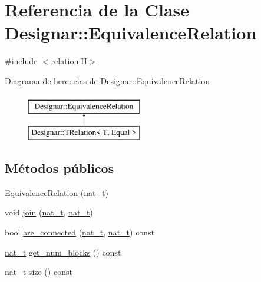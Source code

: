 \hypertarget{class_designar_1_1_equivalence_relation}{}\section{Referencia de la Clase Designar\+:\+:Equivalence\+Relation}
\label{class_designar_1_1_equivalence_relation}


{\ttfamily \#include $<$relation.\+H$>$}

Diagrama de herencias de Designar\+:\+:Equivalence\+Relation\begin{figure}[H]
\begin{center}
\leavevmode
\includegraphics[height=2.000000cm]{class_designar_1_1_equivalence_relation}
\end{center}
\end{figure}
\subsection*{Métodos públicos}
\begin{DoxyCompactItemize}
\item 
\hyperlink{class_designar_1_1_equivalence_relation_a44544ffad6df87c47b30a6cd2a7254f2}{Equivalence\+Relation} (\hyperlink{namespace_designar_aa72662848b9f4815e7bf31a7cf3e33d1}{nat\+\_\+t})
\item 
void \hyperlink{class_designar_1_1_equivalence_relation_a06f07c2d9d53919339afcdd369daa277}{join} (\hyperlink{namespace_designar_aa72662848b9f4815e7bf31a7cf3e33d1}{nat\+\_\+t}, \hyperlink{namespace_designar_aa72662848b9f4815e7bf31a7cf3e33d1}{nat\+\_\+t})
\item 
bool \hyperlink{class_designar_1_1_equivalence_relation_a98972f1d96957b9fac030ca3001094e6}{are\+\_\+connected} (\hyperlink{namespace_designar_aa72662848b9f4815e7bf31a7cf3e33d1}{nat\+\_\+t}, \hyperlink{namespace_designar_aa72662848b9f4815e7bf31a7cf3e33d1}{nat\+\_\+t}) const
\item 
\hyperlink{namespace_designar_aa72662848b9f4815e7bf31a7cf3e33d1}{nat\+\_\+t} \hyperlink{class_designar_1_1_equivalence_relation_a1de9de1745175828d1b3f0184df76920}{get\+\_\+num\+\_\+blocks} () const
\item 
\hyperlink{namespace_designar_aa72662848b9f4815e7bf31a7cf3e33d1}{nat\+\_\+t} \hyperlink{class_designar_1_1_equivalence_relation_abd7ed9854a58f13f215507e50c0eecd3}{size} () const
\end{DoxyCompactItemize}


